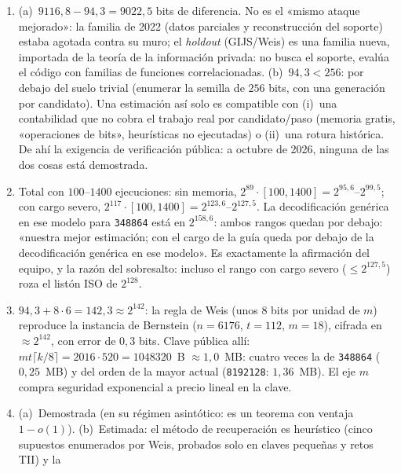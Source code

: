 \begin{enumerate}[leftmargin=1.9em,itemsep=4pt]
  \item (a)~$9116{,}8-94{,}3=9022{,}5$ bits de diferencia. No es el
        «mismo ataque mejorado»: la familia de 2022 (datos
        parciales y reconstrucción del soporte) estaba agotada
        contra su muro; el \emph{holdout} (GIJS/Weis) es una
        familia nueva, importada de la teoría de la información
        privada: no busca el soporte, evalúa el código con familias
        de funciones correlacionadas. (b)~$94{,}3<256$: por debajo
        del suelo trivial (enumerar la semilla de $256$ bits, con
        una generación por candidato). Una estimación así solo es
        compatible con (i)~una contabilidad que no cobra el trabajo
        real por candidato/paso (memoria gratis, «operaciones de
        bits», heurísticas no ejecutadas) o (ii)~una rotura
        histórica. De ahí la exigencia de verificación pública: a
        octubre de 2026, ninguna de las dos cosas está demostrada.
  \item Total con $100$--$1400$ ejecuciones: sin memoria,
        $2^{89}\cdot[100,1400]=2^{95{,}6}$--$2^{99{,}5}$; con cargo
        severo, $2^{117}\cdot[100,1400]=2^{123{,}6}$--$2^{127{,}5}$.
        La decodificación genérica en ese modelo para
        \texttt{348864} está en $2^{158{,}6}$: ambos rangos quedan
        por debajo: «nuestra mejor estimación; con el cargo de la
        guía queda por debajo de la decodificación genérica en ese
        modelo». Es exactamente la afirmación del equipo, y la
        razón del sobresalto: incluso el rango con cargo severo
        ($\le2^{127{,}5}$) roza el listón ISO de $2^{128}$.
  \item $94{,}3+8\cdot6=142{,}3\approx2^{142}$: la regla de Weis
        (unos $8$ bits por unidad de $m$) reproduce la instancia de
        Bernstein ($n=6176$, $t=112$, $m=18$), cifrada en
        $\approx2^{142}$, con error de $0{,}3$ bits. Clave pública
        allí: $mt\lceil k/8\rceil=2016\cdot520=\num{1048320}$~B
        $\approx1{,}0$~MB: cuatro veces la de \texttt{348864}
        ($0{,}25$~MB) y del orden de la mayor actual
        (\texttt{8192128}: $1{,}36$~MB). El eje $m$ compra
        seguridad exponencial a precio lineal en la clave.
  \item (a)~Demostrada (en su régimen asintótico: es un teorema
        con ventaja $1-o(1)$). (b)~Estimada: el método de
        recuperación es heurístico (cinco supuestos enumerados por
        Weis, probados solo en claves pequeñas y retos TII) y la

\end{enumerate}
